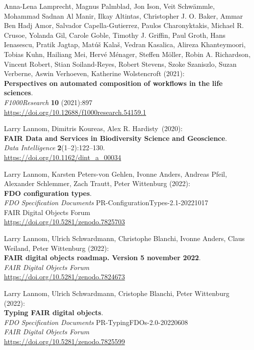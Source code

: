 \begin{thebibliography}{9}
Anna-Lena Lamprecht, Magnus Palmblad, Jon Ison, Veit Schwämmle, Mohammad
Sadnan Al Manir, Ilkay Altintas, Christopher J. O. Baker, Ammar Ben Hadj
Amor, Salvador Capella-Gutierrez, Paulos Charonyktakis, Michael R.
Crusoe, Yolanda Gil, Carole Goble, Timothy J. Griffin, Paul Groth, Hans
Ienasescu, Pratik Jagtap, Matúš Kalaš, Vedran Kasalica, Alireza
Khanteymoori, Tobias Kuhn, Hailiang Mei, Hervé Ménager, Steffen Möller,
Robin A. Richardson, Vincent Robert, Stian Soiland-Reyes, Robert
Stevens, Szoke Szaniszlo, Suzan Verberne, Aswin Verhoeven, Katherine
Wolstencroft (2021): \\
\textbf{Perspectives on automated composition of workflows
in the life sciences}. \\
\emph{F1000Research} \textbf{10} (2021):897 \\
\url{https://doi.org/10.12688/f1000research.54159.1}

Larry Lannom, Dimitris Koureas, Alex R. Hardisty~(2020):\\
\textbf{FAIR Data and Services in Biodiversity Science and
Geoscience}.\\
\emph{Data Intelligence} \textbf{2}(1--2):122--130.\\
\url{https://doi.org/10.1162/dint_a_00034}


Larry Lannom, Karsten Peters-von Gehlen, Ivonne Anders, Andreas Pfeil,
Alexander Schlemmer, Zach Trautt, Peter Wittenburg (2022):\\
\textbf{{FDO} configuration types}. \\
\emph{FDO Specification Documents} PR-ConfigurationTypes-2.1-20221017 \\
FAIR Digital Objects Forum \\
\url{https://doi.org/10.5281/zenodo.7825703}

Larry Lannom, Ulrich Schwardmann, Christophe Blanchi, Ivonne Anders,
Claus Weiland, Peter Wittenburg (2022): \\
\textbf{FAIR digital objects roadmap. Version 5 november 2022}.\\
\emph{FAIR Digital Objects Forum}\\
\url{https://doi.org/10.5281/zenodo.7824673}

Larry Lannom, Ulrich Schwardmann, Cristophe Blanchi, Peter Wittenburg (2022): \\
\textbf{Typing {FAIR} digital objects}. \\
\emph{FDO Specification Documents} PR-TypingFDOs-2.0-20220608 \\
\emph{FAIR Digital Objects Forum}\\
\url{https://doi.org/10.5281/zenodo.7825599}


\end{thebibliography}
